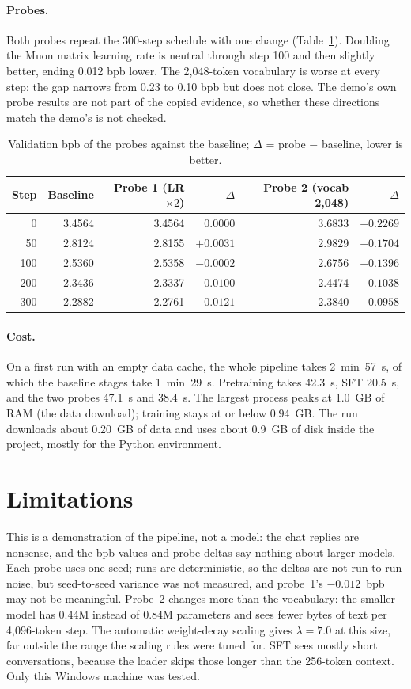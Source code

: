 \documentclass[11pt]{article}
\begin{document}
\paragraph{Probes.} Both probes repeat the 300-step schedule with one change
(Table~\ref{tab:probes}). Doubling the Muon matrix learning rate is neutral
through step 100 and then slightly better, ending 0.012 bpb lower. The
2{,}048-token vocabulary is worse at every step; the gap narrows from 0.23 to
0.10 bpb but does not close. The demo's own probe results are not part of the
copied evidence, so whether these directions match the demo's is not checked.

\begin{table}[t]
\centering
\small
\begin{tabular}{rrrrrr}
\toprule
Step & Baseline & Probe 1 (LR $\times 2$) & $\Delta$ & Probe 2 (vocab 2{,}048) & $\Delta$ \\
\midrule
0   & 3.4564 & 3.4564 & 0.0000  & 3.6833 & $+0.2269$ \\
50  & 2.8124 & 2.8155 & $+0.0031$ & 2.9829 & $+0.1704$ \\
100 & 2.5360 & 2.5358 & $-0.0002$ & 2.6756 & $+0.1396$ \\
200 & 2.3436 & 2.3337 & $-0.0100$ & 2.4474 & $+0.1038$ \\
300 & 2.2882 & 2.2761 & $-0.0121$ & 2.3840 & $+0.0958$ \\
\bottomrule
\end{tabular}
\caption{Validation bpb of the probes against the baseline;
$\Delta$ = probe $-$ baseline, lower is better.}
\label{tab:probes}
\end{table}

\paragraph{Cost.} On a first run with an empty data cache, the whole pipeline
takes 2~min~57~s, of which the baseline stages take 1~min~29~s. Pretraining
takes 42.3~s, SFT 20.5~s, and the two probes 47.1~s and 38.4~s. The largest
process peaks at 1.0~GB of RAM (the data download); training stays at or below
0.94~GB. The run downloads about 0.20~GB of data and uses about 0.9~GB of disk
inside the project, mostly for the Python environment.

\section{Limitations}

This is a demonstration of the pipeline, not a model: the chat replies are
nonsense, and the bpb values and probe deltas say nothing about larger models.
Each probe uses one seed; runs are deterministic, so the deltas are not
run-to-run noise, but seed-to-seed variance was not measured, and probe~1's
$-0.012$~bpb may not be meaningful. Probe~2 changes more than the vocabulary:
the smaller model has 0.44M instead of 0.84M parameters and sees fewer bytes
of text per 4{,}096-token step. The automatic weight-decay scaling gives
$\lambda = 7.0$ at this size, far outside the range the scaling rules were
tuned for. SFT sees mostly short conversations, because the loader skips
those longer than the 256-token context. Only this Windows machine was tested.
\end{document}
